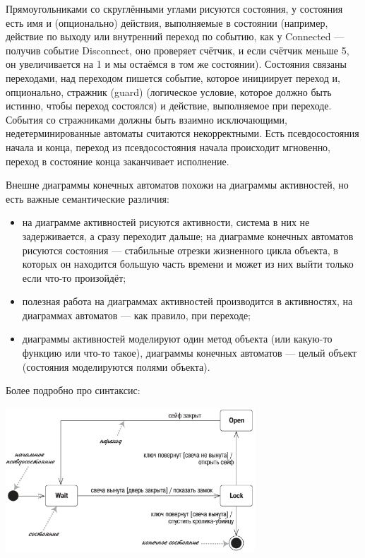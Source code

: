 \documentclass{../mcstext}
\begin{document}
Прямоугольниками со скруглёнными углами рисуются состояния, у состояния есть имя и (опционально) действия, выполняемые в состоянии (например, действие по выходу или внутренний переход по событию, как у Connected --- получив событие Disconnect, оно проверяет счётчик, и если счётчик меньше 5, он увеличивается на 1 и мы остаёмся в том же состоянии). Состояния связаны переходами, над переходом пишется событие, которое инициирует переход и, опционально, стражник (guard) (логическое условие, которое должно быть истинно, чтобы переход состоялся) и действие, выполняемое при переходе. События со стражниками должны быть взаимно исключающими, недетерминированные автоматы считаются некорректными. Есть псевдосостояния начала и конца, переход из псевдосостояния начала происходит мгновенно, переход в состояние конца заканчивает исполнение.

Внешне диаграммы конечных автоматов похожи на диаграммы активностей, но есть важные семантические различия:

\begin{itemize}
    \item на диаграмме активностей рисуются активности, система в них не задерживается, а сразу переходит дальше; на диаграмме конечных автоматов рисуются состояния --- стабильные отрезки жизненного цикла объекта, в которых он находится большую часть времени и может из них выйти только если что-то произойдёт;
    \item полезная работа на диаграммах активностей производится в активностях, на диаграммах автоматов --- как правило, при переходе;
    \item диаграммы активностей моделируют один метод объекта (или какую-то функцию или что-то такое), диаграммы конечных автоматов --- целый объект (состояния моделируются полями объекта).
\end{itemize}

Более подробно про синтаксис:

\begin{center}
    \includegraphics[width=0.7\textwidth]{stateTransitionSyntax.png}
\end{center}
\end{document}
